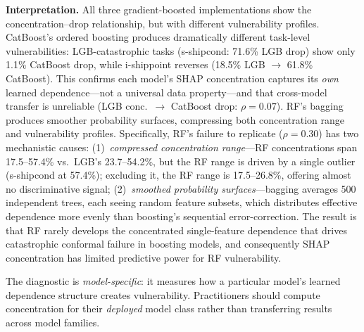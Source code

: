 \documentclass{uai2026} %
\begin{document}
\textbf{Interpretation.} All three gradient-boosted implementations show the concentration--drop relationship, but with different vulnerability profiles. CatBoost's ordered boosting produces dramatically different task-level vulnerabilities: LGB-catastrophic tasks (s-shipcond: 71.6\% LGB drop) show only 1.1\% CatBoost drop, while i-shippoint reverses (18.5\% LGB $\rightarrow$ 61.8\% CatBoost). This confirms each model's SHAP concentration captures its \textit{own} learned dependence---not a universal data property---and that cross-model transfer is unreliable (LGB conc.\ $\rightarrow$ CatBoost drop: $\rho = 0.07$). RF's bagging produces smoother probability surfaces, compressing both concentration range and vulnerability profiles. Specifically, RF's failure to replicate ($\rho = 0.30$) has two mechanistic causes: (1)~\textit{compressed concentration range}---RF concentrations span 17.5--57.4\% vs.\ LGB's 23.7--54.2\%, but the RF range is driven by a single outlier (s-shipcond at 57.4\%); excluding it, the RF range is 17.5--26.8\%, offering almost no discriminative signal; (2)~\textit{smoothed probability surfaces}---bagging averages 500 independent trees, each seeing random feature subsets, which distributes effective dependence more evenly than boosting's sequential error-correction. The result is that RF rarely develops the concentrated single-feature dependence that drives catastrophic conformal failure in boosting models, and consequently SHAP concentration has limited predictive power for RF vulnerability.

The diagnostic is \textit{model-specific}: it measures how a particular model's learned dependence structure creates vulnerability. Practitioners should compute concentration for their \textit{deployed} model class rather than transferring results across model families.
\end{document}
